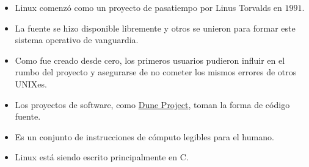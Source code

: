 
\begin{frame}
	\begin{itemize}
		\item
		      
		Linux comenzó como un proyecto de pasatiempo por Linus
			  Torvalds en $1991$.
		
		\item
		
		La fuente se hizo disponible libremente y otros se unieron
		para formar este sistema operativo de vanguardia.

		\item
		
		Como fue creado desde cero, los primeros usuarios pudieron
		influir en el rumbo del proyecto y asegurarse de no cometer
		los mismos errores de otros UNIXes.

		\item

		      Los proyectos de software, como
			  \href{https://dune-project.org}{Dune Project}, toman la
			  forma de código fuente.

		\item
		      Es un conjunto de instrucciones de cómputo legibles
			  para el humano.

		\item
		
		Linux está siendo escrito principalmente en C.
	\end{itemize}
\end{frame}

